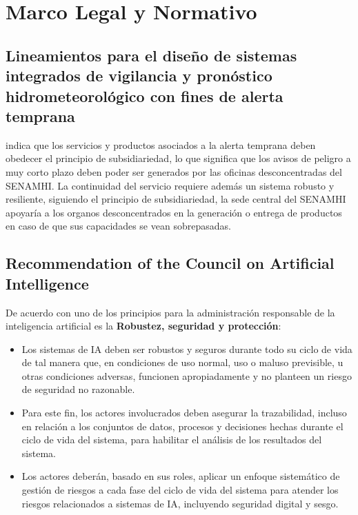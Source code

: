 \section{Marco Legal y Normativo}

\subsection{Lineamientos para el diseño de sistemas integrados de vigilancia y 
pronóstico hidrometeorológico con fines de alerta temprana}

\cite{senamhi2021lineamientos} indica que los servicios y productos asociados a 
la alerta temprana deben obedecer el principio de subsidiariedad, lo que 
significa que los avisos de peligro a muy corto plazo deben poder ser generados 
por las oficinas desconcentradas del SENAMHI.\newline
La continuidad del servicio requiere además un sistema robusto y resiliente, 
siguiendo el principio de subsidiariedad, la sede central del SENAMHI apoyaría 
a los organos desconcentrados en la generación o entrega de productos en caso 
de que sus capacidades se vean sobrepasadas.

\subsection{Recommendation of the Council on Artificial Intelligence}

De acuerdo con \cite{oecd2019recom} uno de los principios para la 
administración responsable de la inteligencia artificial es la 
\textbf{Robustez, seguridad y protección}:
\begin{itemize}
  \item Los sistemas de IA deben ser robustos y seguros durante todo su ciclo 
  de   vida de tal manera que, en condiciones de uso normal, uso o maluso 
  previsible,   u otras condiciones adversas, funcionen apropiadamente y no 
  planteen un riesgo de seguridad no razonable.
  \item Para este fin, los actores involucrados deben asegurar la trazabilidad, 
  incluso en relación a los conjuntos de datos, procesos y decisiones hechas 
  durante el ciclo de vida del sistema, para habilitar el análisis de los 
  resultados del sistema.
  \item Los actores deberán, basado en sus roles, aplicar un enfoque 
  sistemático de gestión de riesgos a cada fase del ciclo de vida del sistema 
  para atender los riesgos relacionados a sistemas de IA, incluyendo seguridad 
  digital y sesgo.
\end{itemize}


